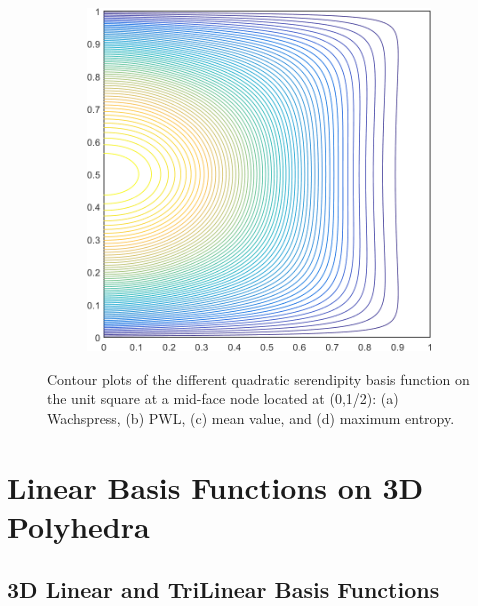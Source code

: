 \begin{figure}
\begin{subfigure}[b]{0.39\textwidth}
		\caption{}
	\end{subfigure}
	\hspace{1.5cm}
	\begin{subfigure}[b]{0.39\textwidth}
		\centering
		\includegraphics[width=\textwidth]{figures/sec_BF/square_MAXENT2_contour_b8.png}
		\caption{}
	\end{subfigure}
\caption[Contour plots of the quadratic basis functions on the unit square.]{Contour plots of the different quadratic serendipity basis function on the unit square at a mid-face node located at (0,1/2): (a) Wachspress, (b) PWL, (c) mean value, and (d) maximum entropy.}
\end{figure}

\section{Linear Basis Functions on 3D Polyhedra}
\label{sec::BF_3DLinear}



\subsection{3D Linear and TriLinear Basis Functions}
\label{sec::BF_3DLinear_TriL}

